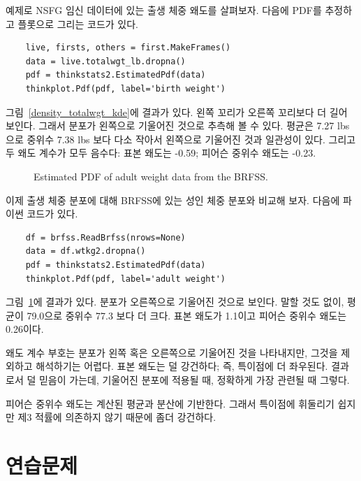 예제로 NSFG 임신 데이터에 있는 출생 체중 왜도를 살펴보자.
다음에 PDF를 추정하고 플롯으로 그리는 코드가 있다.

\begin{verbatim}
    live, firsts, others = first.MakeFrames()
    data = live.totalwgt_lb.dropna()
    pdf = thinkstats2.EstimatedPdf(data)
    thinkplot.Pdf(pdf, label='birth weight')
\end{verbatim}

그림~\ref{density_totalwgt_kde}에 결과가 있다.
왼쪽 꼬리가 오른쪽 꼬리보다 더 길어 보인다. 
그래서 분포가 왼쪽으로 기울어진 것으로 추측해 볼 수 있다.
평균은 7.27 lbs 으로 중위수 7.38 lbs 보다 다소 작아서 왼쪽으로 기울어진 것과
일관성이 있다. 그리고 두 왜도 계수가 모두 음수다: 표본 왜도는  -0.59; 피어슨 중위수 왜도는 -0.23.

\begin{figure}
\caption{Estimated PDF of adult weight data from the BRFSS.}
\label{density_wtkg2_kde}
\end{figure}

이제 출생 체중 분포에 대해 BRFSS에 있는 성인 체중 분포와 비교해 보자.
다음에 파이썬 코드가 있다.

\begin{verbatim}
    df = brfss.ReadBrfss(nrows=None)
    data = df.wtkg2.dropna()
    pdf = thinkstats2.EstimatedPdf(data)
    thinkplot.Pdf(pdf, label='adult weight')
\end{verbatim}

그림~\ref{density_wtkg2_kde}에 결과가 있다.
분포가 오른쪽으로 기울어진 것으로 보인다.
말할 것도 없이, 평균이 79.0으로 중위수 77.3 보다 더 크다.
표본 왜도가 1.1이고 피어슨 중위수 왜도는 0.26이다.

왜도 계수 부호는 분포가 왼쪽 혹은 오른쪽으로 기울어진 것을 나타내지만,
그것을 제외하고 해석하기는 어렵다.
표본 왜도는 덜 강건하다; 즉, 특이점에 더 좌우된다.
결과로서 덜 믿음이 가는데, 기울어진 분포에 적용될 때, 정확하게 가장 관련될 때 그렇다. 


피어슨 중위수 왜도는 계산된 평균과 분산에 기반한다.
그래서 특이점에 휘둘리기 쉽지만 제3 적률에 의존하지 않기 때문에 좀더 강건하다.


\section{연습문제}

